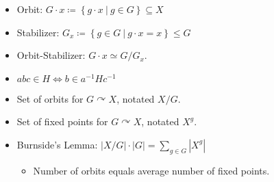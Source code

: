 \begin{concept}

\envlist

\begin{itemize}
\tightlist
\item
  Orbit:
  \(G\cdot x \coloneqq\left\{{g\cdot x {~\mathrel{\Big|}~}g\in G}\right\} \subseteq X\)
\item
  Stabilizer:
  \(G_x \coloneqq\left\{{g\in G{~\mathrel{\Big|}~}g\cdot x = x}\right\} \leq G\)
\item
  Orbit-Stabilizer: \(G\cdot x \simeq G/G_x\).
\item
  \(abc\in H \iff b\in a^{-1}H c^{-1}\)
\item
  Set of orbits for \(G\curvearrowright X\), notated \(X/G\).
\item
  Set of fixed points for \(G\curvearrowright X\), notated \(X^g\).
\item
  Burnside's Lemma:
  \({\left\lvert {X/G} \right\rvert} \cdot {\left\lvert {G} \right\rvert} = \sum_{g\in G} {\left\lvert {X^g} \right\rvert}\)

  \begin{itemize}
  \tightlist
  \item
    Number of orbits equals average number of fixed points.
  \end{itemize}
\end{itemize}

\end{concept}

